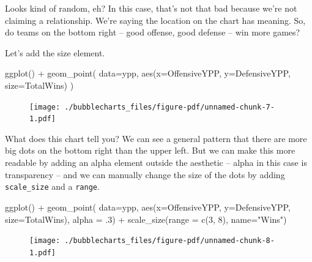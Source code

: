 \documentclass[
  letterpaper,
  DIV=11,
  numbers=noendperiod]{scrreprt}
\newenvironment{Shaded}{\begin{snugshade}}{\end{snugshade}}
\newcommand{\AttributeTok}[1]{\textcolor[rgb]{0.40,0.45,0.13}{#1}}
\newcommand{\DecValTok}[1]{\textcolor[rgb]{0.68,0.00,0.00}{#1}}
\newcommand{\FunctionTok}[1]{\textcolor[rgb]{0.28,0.35,0.67}{#1}}
\newcommand{\NormalTok}[1]{\textcolor[rgb]{0.00,0.23,0.31}{#1}}
\newcommand{\SpecialCharTok}[1]{\textcolor[rgb]{0.37,0.37,0.37}{#1}}
\newcommand{\StringTok}[1]{\textcolor[rgb]{0.13,0.47,0.30}{#1}}
\begin{document}
Looks kind of random, eh? In this case, that's not that bad because
we're not claiming a relationship. We're saying the location on the
chart has meaning. So, do teams on the bottom right -- good offense,
good defense -- win more games?

Let's add the size element.

\begin{Shaded}
\begin{Highlighting}[]
\FunctionTok{ggplot}\NormalTok{() }\SpecialCharTok{+} 
  \FunctionTok{geom\_point}\NormalTok{(}
    \AttributeTok{data=}\NormalTok{ypp, }
    \FunctionTok{aes}\NormalTok{(}\AttributeTok{x=}\NormalTok{OffensiveYPP, }\AttributeTok{y=}\NormalTok{DefensiveYPP, }\AttributeTok{size=}\NormalTok{TotalWins)}
\NormalTok{    )}
\end{Highlighting}
\end{Shaded}

\begin{figure}[H]

{\centering \texttt{[image: ./bubblecharts\_files/figure-pdf/unnamed-chunk-7-1.pdf]}

}

\end{figure}

What does this chart tell you? We can see a general pattern that there
are more big dots on the bottom right than the upper left. But we can
make this more readable by adding an alpha element outside the aesthetic
-- alpha in this case is transparency -- and we can manually change the
size of the dots by adding \texttt{scale\_size} and a \texttt{range}.

\begin{Shaded}
\begin{Highlighting}[]
\FunctionTok{ggplot}\NormalTok{() }\SpecialCharTok{+} 
  \FunctionTok{geom\_point}\NormalTok{(}
    \AttributeTok{data=}\NormalTok{ypp, }
    \FunctionTok{aes}\NormalTok{(}\AttributeTok{x=}\NormalTok{OffensiveYPP, }\AttributeTok{y=}\NormalTok{DefensiveYPP, }\AttributeTok{size=}\NormalTok{TotalWins),}
    \AttributeTok{alpha =}\NormalTok{ .}\DecValTok{3}\NormalTok{) }\SpecialCharTok{+} 
  \FunctionTok{scale\_size}\NormalTok{(}\AttributeTok{range =} \FunctionTok{c}\NormalTok{(}\DecValTok{3}\NormalTok{, }\DecValTok{8}\NormalTok{), }\AttributeTok{name=}\StringTok{"Wins"}\NormalTok{)}
\end{Highlighting}
\end{Shaded}

\begin{figure}[H]

{\centering \texttt{[image: ./bubblecharts\_files/figure-pdf/unnamed-chunk-8-1.pdf]}

}

\end{figure}
\end{document}

